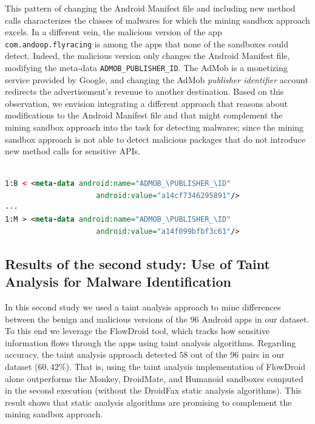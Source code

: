 This pattern of changing the Android Manifest file and including
new method calls characterizes the classes of malwares for which
the mining sandbox approach excels. 
In a different vein, the malicious version of the app
\texttt{com.andoop.flyracing} is among the apps that none of the sandboxes could
detect. Indeed, the malicious version only changes the Android Manifest file,
modifying the meta-data \texttt{ADMOB\_PUBLISHER\_ID}. The AdMob is a monetizing
service provided by Google, and changing the AdMob \emph{publisher identifier} account redirects
the advertisement's revenue to another destination. Based on
this observation, we envision integrating a different approach that reasons
about modifications to the Android Manifest file and that might complement the mining sandbox
approach into the task for detecting malwares; since the mining
sandbox approach is not able to detect malicious packages that
do not introduce new method calls for sensitive APIs.

\begin{lstlisting}[caption={Diff in the file \texttt{com.andoop.flyracing}
      AndroidManifest file of the malicious version.
      \texttt{B} stands for
      the benign version, while \texttt{M} stands for the malign version.}, language=XML,
    basicstyle=\fontsize{8}{6}\selectfont\ttfamily,label={lst:app65b}]

1:B < <meta-data android:name="ADMOB_\PUBLISHER_\ID"
                     android:value="a14cf7346295891"/>
---
1:M > <meta-data android:name="ADMOB_\PUBLISHER_\ID"
                     android:value="a14f099bfbf3c61"/>
\end{lstlisting}


\subsection{Results of the second study: Use of Taint Analysis for Malware Identification}\label{sec:res-ss}

In this second study we used a taint analysis approach to mine differences between the
benign and malicious versions of the 96 Android apps in our dataset. To this end we leverage the FlowDroid
tool, which tracks how sensitive information flows through the apps using taint analysis algorithms.
Regarding accuracy, the taint analysis approach detected $58$ out of the $96$ pairs in our dataset ($60,42$\%). That is,
using the taint analysis implementation of FlowDroid alone outperforms the Monkey, DroidMate,
and Humanoid sandboxes computed in the second execution (without the DroidFax static analysis
algorithms). This result shows that static analysis algorithms are promising to complement
the mining sandbox approach.

